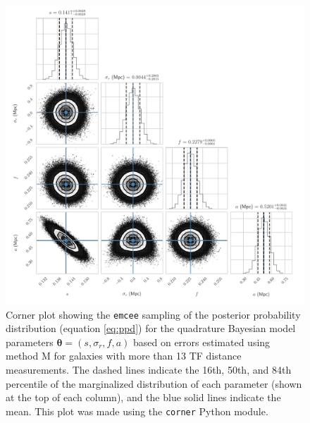 \documentclass[a4paper,fleqn,usenatbib]{mnras}
\begin{document}
\begin{figure}
	\includegraphics[scale=0.7]{cornerq2}
    \caption{Corner plot showing the \texttt{emcee} sampling of the posterior probability distribution (equation \ref{eq:ppd}) for the quadrature Bayesian model parameters $\pmb{\theta}=(s,\sigma_r,f,a)$ based on errors estimated using method M for galaxies with more than 13 TF distance measurements. The dashed lines indicate the 16th, 50th, and 84th percentile of the marginalized distribution of each parameter (shown at the top of each column), and the blue solid lines indicate the mean. This plot was made using the \texttt{corner} Python module.}
    \label{fig:cornerq2}
\end{figure}
\end{document}
